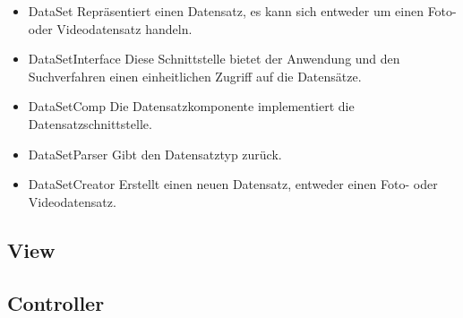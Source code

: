 \begin{itemize}
	\item DataSet \newline
Repräsentiert einen Datensatz, es kann sich entweder um einen Foto- oder Videodatensatz handeln.

	\item DataSetInterface \newline
Diese Schnittstelle bietet der Anwendung und den Suchverfahren einen einheitlichen Zugriff auf die Datensätze.

	\item DataSetComp \newline
Die Datensatzkomponente implementiert die Datensatzschnittstelle.

	\item DataSetParser \newline
Gibt den Datensatztyp zurück.

	\item DataSetCreator \newline
Erstellt einen neuen Datensatz, entweder einen Foto- oder Videodatensatz.

\end{itemize}

\subsection{View}

\subsection{Controller}